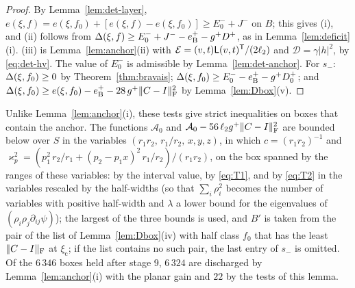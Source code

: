 \begin{proof}
By Lemma~\ref{lem:det-layer}, $e(\xi,f)=e(\xi,f_0)+[e(\xi,f)-e(\xi,f_0)]\ge E_0^-+J^-$ on $B$; this gives (i), and (ii) follows
from $\Delta(\xi,f)\ge E_0^-+J^--e_{\mathrm B}^+-g^+D^+$, as in Lemma~\ref{lem:deficit}(i). (iii) is Lemma~\ref{lem:anchor}(ii) with
$\mathcal E=(v,t)\mathsf L(v,t)^\mathsf T/(2\ell_2)$ and $\mathcal D=\gamma|h|^2$, by \eqref{eq:det-hv}. The value of $E_0^-$ is admissible by
Lemma~\ref{lem:det-anchor}. For $s_-$: $\Delta(\xi,f_0)\ge0$ by Theorem~\ref{thm:bravais}; $\Delta(\xi,f_0)\ge E_0^--e_{\mathrm B}^+-g^+D_0^+$;
and $\Delta(\xi,f_0)\ge e(\xi,f_0)-e_{\mathrm B}^+-28\,g^+\|C-I\|_\mathrm F^2$ by Lemma~\ref{lem:Dbox}(v).
\end{proof}

Unlike Lemma~\ref{lem:anchor}(i), these tests give strict inequalities on boxes that contain the anchor. The functions
$\mathcal A_0$ and $\mathcal A_0-56\,\ell_2g^+\|C-I\|_\mathrm F^2$ are bounded below over $S$ in the variables
$(r_1r_2,\,r_1/r_2,\,x,y,z)$, in which $c=(r_1r_2)^{-1}$ and
$\varkappa_p^2=(p_1^2\,r_2/r_1+(p_2-p_1x)^2\,r_1/r_2)/(r_1r_2)$, on the box spanned by the ranges of these variables: by the interval
value, by \eqref{eq:T1}, and by \eqref{eq:T2} in the variables rescaled by the half-widths (so that $\sum_i\rho_i^2$ becomes the
number of variables with positive half-width and $\lambda$ a lower bound for the eigenvalues of
$(\rho_i\rho_j\partial_{ij}\psi)$); the largest of the three bounds is used, and $B'$ is taken from the pair of the list of
Lemma~\ref{lem:Dbox}(iv) with half class $f_0$ that has the least $\|C-I\|_\mathrm F$ at $\xi_{\mathrm c}$; if the list contains no such
pair, the last entry of $s_-$ is omitted. Of the $6\,346$ boxes held after stage 9, $6\,324$ are discharged by
Lemma~\ref{lem:anchor}(i) with the planar gain and $22$ by the tests of this lemma.
